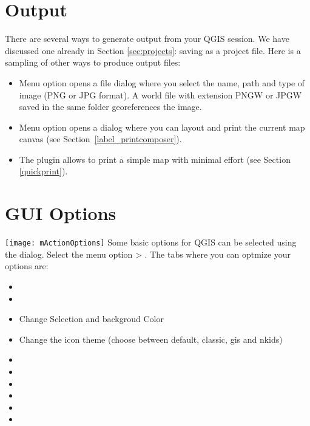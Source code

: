 \section{Output}\label{sec:output}

There are several ways to generate output from your QGIS session. We have
discussed one already in Section \ref{sec:projects}: saving as a project file. 
Here is a sampling of other ways to produce output files:

\begin{itemize}
\item Menu option  opens
a file dialog where you select the name, path and type of image (PNG or JPG
format). A world file with extension PNGW or JPGW saved in the same folder
georeferences the image.
\item Menu option  opens a
dialog where you can layout and print the current map canvas (see
Section~\ref{label_printcomposer}).
\item The  plugin allows
to print a simple map with minimal effort (see Section \ref{quickprint}).
\end{itemize}

\section{GUI Options}\label{subsec:gui_options}

\texttt{[image: mActionOptions]} Some basic options
for QGIS can be selected using the  dialog. Select the 
menu option  >
. The tabs where you can 
optmize your options are:


\begin{itemize}
\item {}
\item {}
\item Change Selection and backgroud Color
\item Change the icon theme (choose between default, classic, gis and nkids)
\item {}
\item {}
\item {}
\item {}
\item {}
\item {}
\end{itemize}

